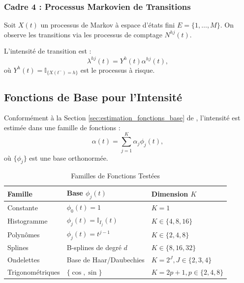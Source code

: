 \documentclass[12pt,a4paper]{article}
\begin{document}
	\subsubsection{Cadre 4 : Processus Markovien de Transitions}
	\label{subsubsec:cadre_markov}
	
	Soit $X(t)$ un processus de Markov à espace d'états fini $E = \{1, \dots, M\}$. On observe les transitions via les processus de comptage $N^{hj}(t)$.
	
	L'intensité de transition est :
	\begin{equation}
		\lambda^{hj}(t) = Y^h(t) \alpha^{hj}(t),
	\end{equation}
	où $Y^h(t) = \mathbb{I}_{\{X(t^-) = h\}}$ est le processus à risque.
	
	\subsection{Fonctions de Base pour l'Intensité}
	\label{subsec:familles_fonctions}
	
	Conformément à la Section \ref{sec:estimation_fonctions_base} de \cite{Uniform_temporal_light.tex}, l'intensité est estimée dans une famille de fonctions :
	\begin{equation}
		\alpha(t) = \sum_{j=1}^K \alpha_j \phi_j(t),
	\end{equation}
	où $\{\phi_j\}$ est une base orthonormée.
	
	\begin{table}[h]
		\centering
		\caption{Familles de Fonctions Testées}
		\label{tab:familles_fonctions}
		\begin{tabular}{@{}lll@{}}
			\toprule
			\textbf{Famille} & \textbf{Base $\phi_j(t)$} & \textbf{Dimension $K$} \\
			\midrule
			Constante & $\phi_0(t) = 1$ & $K=1$ \\
			Histogramme & $\phi_j(t) = \mathbb{I}_{I_j}(t)$ & $K \in \{4, 8, 16\}$ \\
			Polynômes & $\phi_j(t) = t^{j-1}$ & $K \in \{2, 4, 8\}$ \\
			Splines & B-splines de degré $d$ & $K \in \{8, 16, 32\}$ \\
			Ondelettes & Base de Haar/Daubechies & $K = 2^J, J \in \{2,3,4\}$ \\
			Trigonométriques & $\{\cos, \sin\}$ & $K = 2p+1, p \in \{2,4,8\}$ \\
			\bottomrule
		\end{tabular}
	\end{table}
	
\end{document}

